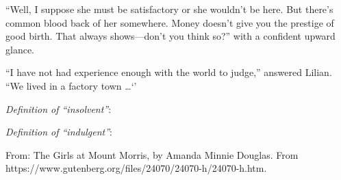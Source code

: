 \begin{enumerate}
``Well, I suppose she must be satisfactory or she wouldn’t be here. But there’s common blood back of her somewhere. Money doesn’t give you the prestige of good birth. That always shows—don’t you think so?'' with a confident upward glance.

``I have not had experience enough with the world to judge,'' answered Lilian. ``We lived in a factory town \ldots `'

\textit{Definition of ``insolvent''}: \hrulefill

\hrulefill

\textit{Definition of ``indulgent''}: \hrulefill

\hrulefill

From: The Girls at Mount Morris, by Amanda Minnie Douglas. From \sloppy https://www.gutenberg.org/files/24070/24070-h/24070-h.htm.
\end{enumerate}











